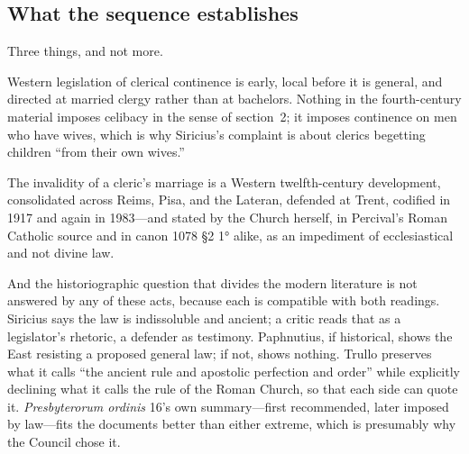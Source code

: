 \subsection{What the sequence establishes}

Three things, and not more.

Western legislation of clerical continence is early, local before it is general, and directed at married clergy rather than at bachelors. Nothing in the fourth-century material imposes celibacy in the sense of section~2; it imposes continence on men who have wives, which is why Siricius's complaint is about clerics begetting children ``from their own wives.''

The invalidity of a cleric's marriage is a Western twelfth-century development, consolidated across Reims, Pisa, and the Lateran, defended at Trent, codified in 1917 and again in 1983---and stated by the Church herself, in Percival's Roman Catholic source and in canon 1078 §2 1° alike, as an impediment of ecclesiastical and not divine law.

And the historiographic question that divides the modern literature is not answered by any of these acts, because each is compatible with both readings. Siricius says the law is indissoluble and ancient; a critic reads that as a legislator's rhetoric, a defender as testimony. Paphnutius, if historical, shows the East resisting a proposed general law; if not, shows nothing. Trullo preserves what it calls ``the ancient rule and apostolic perfection and order'' while explicitly declining what it calls the rule of the Roman Church, so that each side can quote it. \emph{Presbyterorum ordinis} 16's own summary---first recommended, later imposed by law---fits the documents better than either extreme, which is presumably why the Council chose it.
